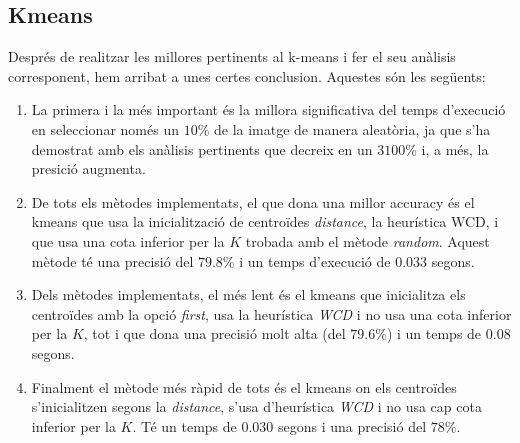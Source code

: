 \documentclass[a4paper, 11pt]{article}
\begin{document}
\subsection{Kmeans}
Després de realitzar les millores pertinents al k-means i fer el seu anàlisis corresponent, hem arribat a unes certes conclusion. Aquestes són les següents:
\begin{enumerate}
    \item La primera i la més important és la millora significativa del temps d'execució en seleccionar només un $10\%$ de la imatge de manera aleatòria, ja que s'ha demostrat amb els anàlisis pertinents que decreix en un $3100\%$ i, a més, la presició augmenta.
    \item De tots els mètodes implementats, el que dona una millor accuracy és el kmeans que usa la inicialització de centroïdes \textit{distance}, la heurística WCD, i que usa una cota inferior per la $K$ trobada amb el mètode \textit{random}. Aquest mètode té una precisió del $79.8\%$ i un temps d'execució de $0.033$ segons.
    \item Dels mètodes implementats, el més lent és el kmeans que inicialitza els centroïdes amb la opció \textit{first}, usa la heurística \textit{WCD} i no usa una cota inferior per la $K$, tot i que dona una precisió molt alta (del $79.6\%$) i un temps de $0.08$ segons.
    \item Finalment el mètode més ràpid de tots és el kmeans on els centroïdes s'inicialitzen segons la \textit{distance}, s'usa d'heurística \textit{WCD} i no usa cap cota inferior per la $K$. Té un temps de $0.030$ segons i una precisió del $78\%$.
\end{enumerate}
\newpage
\end{document}
